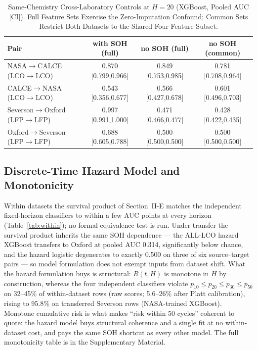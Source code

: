 \begin{table}[!t]
\caption{Same-Chemistry Cross-Laboratory Controls at $H{=}20$ (XGBoost, Pooled AUC [CI]). Full Feature Sets Exercise the Zero-Imputation Confound; Common Sets Restrict Both Datasets to the Shared Four-Feature Subset.}
\label{tab:samechem}
\centering
\footnotesize
\begin{tabular}{lccc}
\toprule
\textbf{Pair} & \textbf{with SOH (full)} & \textbf{no SOH (full)} & \textbf{no SOH (common)}\\
\midrule
NASA$\to$CALCE (LCO$\to$LCO) & 0.870 [0.799,0.966] & 0.849 [0.753,0.985] & 0.781 [0.708,0.964] \\
CALCE$\to$NASA (LCO$\to$LCO) & 0.543 [0.356,0.677] & 0.566 [0.427,0.678] & 0.601 [0.496,0.703] \\
Severson$\to$Oxford (LFP$\to$LFP) & 0.997 [0.991,1.000] & 0.471 [0.466,0.477] & 0.428 [0.422,0.435] \\
Oxford$\to$Severson (LFP$\to$LFP) & 0.688 [0.605,0.788] & 0.500 [0.500,0.500] & 0.500 [0.500,0.500] \\
\bottomrule
\end{tabular}
\end{table}

\subsection{Discrete-Time Hazard Model and Monotonicity}
Within datasets the survival product of Section~II-E matches the independent fixed-horizon classifiers to within a few AUC points at every horizon (Table~\ref{tab:within}); no formal equivalence test is run. Under transfer the survival product inherits the same SOH dependence --- the ALL-LCO hazard XGBoost transfers to Oxford at pooled AUC 0.314, significantly below chance, and the hazard logistic degenerates to exactly 0.500 on three of six source--target pairs --- so model formulation does not exempt inputs from dataset shift. What the hazard formulation buys is structural: $R(t,H)$ is monotone in $H$ by construction, whereas the four independent classifiers violate $p_{10}\le p_{20}\le p_{30}\le p_{50}$ on 32--45\% of within-dataset rows (raw scores; 5.6--26\% after Platt calibration), rising to 95.8\% on transferred Severson rows (NASA-trained XGBoost). Monotone cumulative risk is what makes ``risk within 50 cycles'' coherent to quote: the hazard model buys structural coherence and a single fit at no within-dataset cost, and pays the same SOH shortcut as every other model. The full monotonicity table is in the Supplementary Material.

